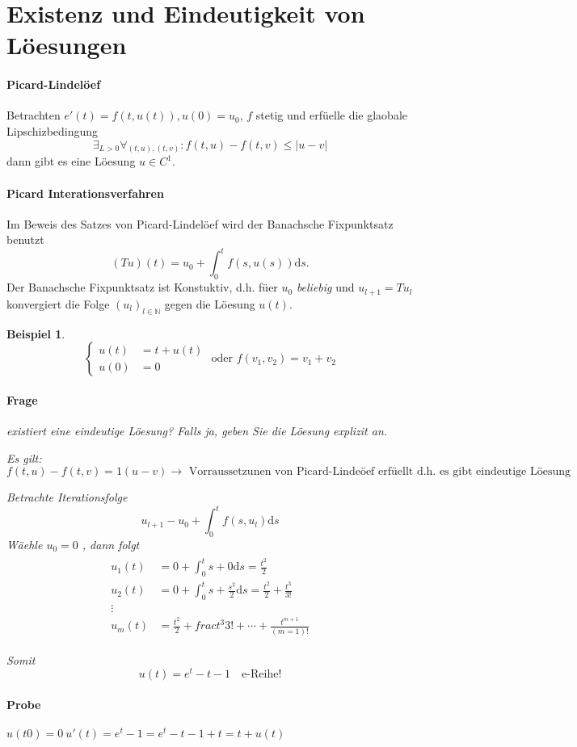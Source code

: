 \documentclass[11pt]{article}
\newcommand{\dd}{\mathrm{d}}
\newcommand{\NN}{\mathbb{N}}
\newcounter{myCounter}[section]
\newtheorem{Bsp}[myCounter]{Beispiel}
\begin{document}
\section{Existenz und Eindeutigkeit von L\"oesungen}

\paragraph{Picard-Lindel\"oef}
Betrachten $e'(t) = f(t,u(t)), u(0) = u_0$, $f$ stetig und erf\"uelle die glaobale
Lipschizbedingung \[ \exists_{L>0} \forall_{(t,u),(t,v)} : f(t,u) - f(t,v) \leq
|u-v| \] dann gibt es eine L\"oesung $u \in C^1$.

\paragraph{Picard Interationsverfahren}
Im Beweis des Satzes von Picard-Lindel\"oef wird der Banachsche Fixpunktsatz
benutzt \[ (Tu)(t) = u_0 + \int_0^t f(s,u(s)) \dd s. \]
Der Banachsche Fixpunktsatz ist Konstuktiv, d.h. f\"uer $u_0$ \emph{beliebig}
und $u_{l+1} = Tu_l$ konvergiert die Folge $(u_l)_{l \in \NN}$ gegen die
L\"oesung $u(t)$.

\begin{Bsp}
  \[ \left\{\begin{aligned} u(t)&=t+ u(t) \\ u(0) &= 0 \end{aligned} \right.
    \text{ oder } f(v_1,v_2) = v_1 + v_2 \]
  \paragraph{Frage} existiert eine eindeutige L\"oesung? Falls ja, geben Sie die
  L\"oesung explizit an.

  Es gilt: $f(t,u) - f(t,v) = 1 (u - v) \rightarrow \text{ Vorraussetzunen von
  Picard-Linde\"oef erf\"uellt d.h. es gibt eindeutige L\"oesung }$

  Betrachte Iterationsfolge \[
    u_{l+1} - u_0 + \int_0^t f(s,u_l) \dd s \]
    W\"aehle $u_ 0 = 0$ , dann folgt
  \begin{align*}
    \begin{matrix}
      u_1(t) &= 0 + \int_0^t s + 0 \dd s = \frac{t^2}{2} \\
      u_2(t) &= 0 + \int_0^t s + \frac{s^2}{2} \dd s = \frac{t^2}{2} + \frac{t^3}{3!} \\
      \vdots \\
      u_m(t) &= \frac{t^2}{2} + frac{t^3}{3!} + \dotsb + \frac{t^{m+1}}{(m=1)!}
    \end{matrix}
  \end{align*}

  Somit \[ u(t) = e^t - t - 1 \quad \text {e-Reihe!} \]

  \paragraph{Probe} $u(t0) = 0 \ u'(t) = e^t - 1 = e^t - t - 1 + t = t +
  u(t)$
\end{Bsp}
\end{document}
